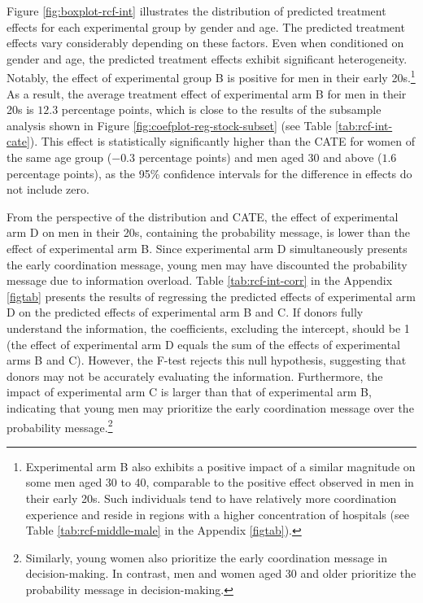 \documentclass[12pt, a4paper]{article}
\begin{document}
Figure \ref{fig:boxplot-rcf-int} illustrates the distribution of predicted treatment effects for each experimental group by gender and age. The predicted treatment effects vary considerably depending on these factors. Even when conditioned on gender and age, the predicted treatment effects exhibit significant heterogeneity. Notably, the effect of experimental group B is positive for men in their early 20s.\footnote{Experimental arm B also exhibits a positive impact of a similar magnitude on some men aged 30 to 40, comparable to the positive effect observed in men in their early 20s. Such individuals tend to have relatively more coordination experience and reside in regions with a higher concentration of hospitals (see Table \ref{tab:rcf-middle-male} in the Appendix \ref{figtab}).} As a result, the average treatment effect of experimental arm B for men in their 20s is \(12.3\) percentage points, which is close to the results of the subsample analysis shown in Figure \ref{fig:coefplot-reg-stock-subset} (see Table \ref{tab:rcf-int-cate}). This effect is statistically significantly higher than the CATE for women of the same age group (\(-0.3\) percentage points) and men aged 30 and above (\(1.6\) percentage points), as the 95\% confidence intervals for the difference in effects do not include zero.

From the perspective of the distribution and CATE, the effect of experimental arm D on men in their 20s, containing the probability message, is lower than the effect of experimental arm B. Since experimental arm D simultaneously presents the early coordination message, young men may have discounted the probability message due to information overload. Table \ref{tab:rcf-int-corr} in the Appendix \ref{figtab} presents the results of regressing the predicted effects of experimental arm D on the predicted effects of experimental arm B and C. If donors fully understand the information, the coefficients, excluding the intercept, should be 1 (the effect of experimental arm D equals the sum of the effects of experimental arms B and C). However, the F-test rejects this null hypothesis, suggesting that donors may not be accurately evaluating the information. Furthermore, the impact of experimental arm C is larger than that of experimental arm B, indicating that young men may prioritize the early coordination message over the probability message.\footnote{Similarly, young women also prioritize the early coordination message in decision-making. In contrast, men and women aged 30 and older prioritize the probability message in decision-making.}
\end{document}
